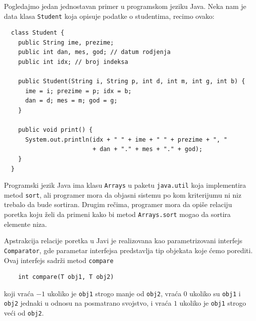 Pogledajmo jedan jednostavan primer u programskom jeziku Java. Neka nam je data klasa \texttt{Student} koja opisuje podatke o studentima, recimo ovako:
{\small
\begin{verbatim}
  class Student {
    public String ime, prezime;
    public int dan, mes, god; // datum rodjenja
    public int idx; // broj indeksa

    public Student(String i, String p, int d, int m, int g, int b) {
      ime = i; prezime = p; idx = b;
      dan = d; mes = m; god = g;
    }

    public void print() {
      System.out.println(idx + " " + ime + " " + prezime + ", "
                         + dan + "." + mes + "." + god);
    }
  }
\end{verbatim}
}
Programski jezik Java ima klasu \verb`Arrays` u paketu \texttt{java.util}
koja implementira metod \verb`sort`, ali programer mora da objasni sistemu
po kom kriterijumu ni niz trebalo da bude sortiran. Drugim re\v cima, programer mora da opi\v se relaciju poretka
koju \v zeli da primeni kako bi metod \verb`Arrays.sort` mogao da sortira elemente niza.

Apstrakcija relacije poretka u Javi je realizovana kao parametrizovani interfejs \verb`Comparator`, gde
parametar interfejsa predstavlja tip objekata koje \'cemo porediti. Ovaj interfejs sadr\v zi metod
\texttt{compare}
{\small
\begin{verbatim}
    int compare(T obj1, T obj2)
\end{verbatim}
}
\noindent
koji vra\'ca $-1$ ukoliko je \verb`obj1` strogo manje od \verb`obj2`,
vra\'ca $0$ ukoliko su \verb`obj1` i \verb`obj2` jednaki u odnosu na posmatrano svojstvo,
i vra\'ca $1$ ukoliko je \verb`obj1` strogo ve\'ci od \verb`obj2`.

